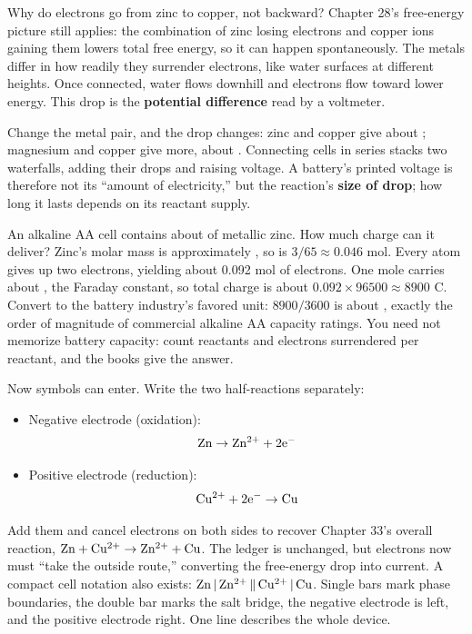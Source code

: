 Why do electrons go from zinc to copper, not backward? Chapter 28's free-energy picture still applies: the combination of zinc losing electrons and copper ions gaining them lowers total free energy, so it can happen spontaneously. The metals differ in how readily they surrender electrons, like water surfaces at different heights. Once connected, water flows downhill and electrons flow toward lower energy. This drop is the \textbf{potential difference} read by a voltmeter.

Change the metal pair, and the drop changes: zinc and copper give about ; magnesium and copper give more, about . Connecting cells in series stacks two waterfalls, adding their drops and raising voltage. A battery's printed voltage is therefore not its ``amount of electricity,'' but the reaction's \textbf{size of drop}; how long it lasts depends on its reactant supply.

\begin{qiaoliang}
An alkaline AA cell contains about  of metallic zinc. How much charge can it deliver? Zinc's molar mass is approximately , so  is $3/65\approx 0.046$ mol. Every atom gives up two electrons, yielding about 0.092 mol of electrons. One mole carries about , the Faraday constant, so total charge is about $0.092\times 96500\approx 8900$ C. Convert to the battery industry's favored unit: $8900/3600$ is about , exactly the order of magnitude of commercial alkaline AA capacity ratings. You need not memorize battery capacity: count reactants and electrons surrendered per reactant, and the books give the answer.
\end{qiaoliang}

Now symbols can enter. Write the two half-reactions separately:

\begin{itemize}[itemsep=2pt]
\item Negative electrode (oxidation): \[\mathrm{Zn} \rightarrow \mathrm{Zn^{2+}} + \mathrm{2e^-}\]
\item Positive electrode (reduction): \[\mathrm{Cu^{2+}} + \mathrm{2e^-} \rightarrow \mathrm{Cu}\]
\end{itemize}

Add them and cancel electrons on both sides to recover Chapter 33's overall reaction, $\mathrm{Zn} + \mathrm{Cu^{2+}} \rightarrow \mathrm{Zn^{2+}} + \mathrm{Cu}$. The ledger is unchanged, but electrons now must ``take the outside route,'' converting the free-energy drop into current. A compact cell notation also exists: $\mathrm{Zn}\,|\,\mathrm{Zn^{2+}}\,\|\,\mathrm{Cu^{2+}}\,|\,\mathrm{Cu}$. Single bars mark phase boundaries, the double bar marks the salt bridge, the negative electrode is left, and the positive electrode right. One line describes the whole device.

